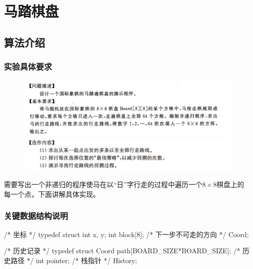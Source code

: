 \section{马踏棋盘}

\subsection{算法介绍}

\subsubsection{实验具体要求}

\begin{figure}[H]
  \flushleft
  \includegraphics[width=15cm]{fig/KTP1.jpg}
  \includegraphics[width=15cm]{fig/KTP2.png}
\end{figure}

\noindent
需要写出一个非递归的程序使马在以“日”字行走的过程中遍历一个$8 \times 8$棋盘上的每一个点，下面讲解具体实现。

\vspace{1ex}

\subsubsection{关键数据结构说明}


    /* 坐标 */
    typedef struct {
        int x, y;
        int block[8]; /* 下一步不可走的方向 */
    } Coord;

    /* 历史记录 */
    typedef struct {
        Coord path[BOARD_SIZE*BOARD_SIZE]; /* 历史路径 */
        int pointer;                       /* 栈指针   */
    } History;

